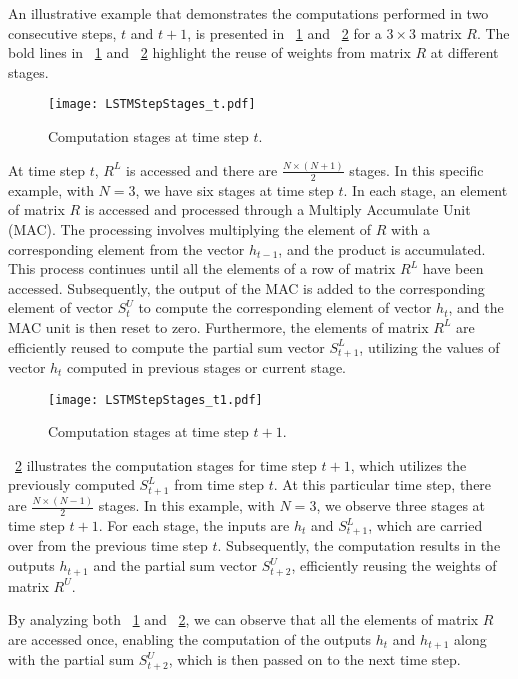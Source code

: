 An illustrative example that demonstrates the computations performed in two consecutive steps, $t$ and $t{+}1$, is presented in \figurename{~\ref{fig:ExampleComputation_t}} and \figurename{~\ref{fig:ExampleComputation_t+1}} for a $3{\times}3$ matrix $R$. The bold lines in \figurename{~\ref{fig:ExampleComputation_t}} and \figurename{~\ref{fig:ExampleComputation_t+1}} highlight the reuse of weights from matrix $R$ at different stages.
\begin{figure}[htbp]
	\centerline{\texttt{[image: LSTMStepStages\_t.pdf]}}
	\caption{Computation stages at time step $t$.}
	\label{fig:ExampleComputation_t}
\end{figure}

At time step $t$, $R^L$ is accessed and there are $\frac{N{\times}(N{+}1)}{2}$ stages. In this specific example, with $N=3$, we have six stages at time step $t$. In each stage, an element of matrix $R$ is accessed and processed through a Multiply Accumulate Unit (MAC). The processing involves multiplying the element of $R$ with a corresponding element from the vector $h_{t{-}1}$, and the product is accumulated. This process continues until all the elements of a row of matrix $R^L$ have been accessed. Subsequently, the output of the MAC is added to the corresponding element of vector $S^U_{t}$ to compute the corresponding element of vector $h_t$, and the MAC unit is then reset to zero. Furthermore, the elements of matrix $R^L$ are efficiently reused to compute the partial sum vector $S^L_{t{+}1}$, utilizing the values of vector $h_{t}$ computed in previous stages or current stage.
\begin{figure}[htbp]
	\centerline{\texttt{[image: LSTMStepStages\_t1.pdf]}}
	\caption{Computation stages at time step $t{+}1$.}
	\label{fig:ExampleComputation_t+1}
\end{figure}

\figurename{~\ref{fig:ExampleComputation_t+1}} illustrates the computation stages for time step $t{+}1$, which utilizes the previously computed $S^L_{t{+}1}$ from time step $t$. At this particular time step, there are $\frac{N{\times}(N{-}1)}{2}$ stages. In this example, with $N=3$, we observe three stages at time step $t{+}1$. For each stage, the inputs are $h_t$ and $S^L_{t{+}1}$, which are carried over from the previous time step $t$. Subsequently, the computation results in the outputs $h_{t{+}1}$ and the partial sum vector $S^U_{t{+}2}$, efficiently reusing the weights of matrix $R^U$.

By analyzing both \figurename{~\ref{fig:ExampleComputation_t}} and \figurename{~\ref{fig:ExampleComputation_t+1}}, we can observe that all the elements of matrix $R$ are accessed once, enabling the computation of the outputs $h_t$ and $h_{t{+}1}$ along with the partial sum $S^U_{t{+}2}$, which is then passed on to the next time step.

